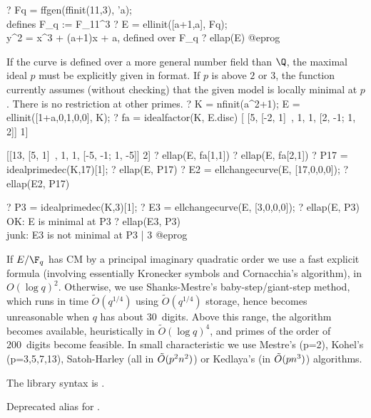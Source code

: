 ? Fq = ffgen(ffinit(11,3), 'a); \\ defines F_q := F_{11^3}
? E = ellinit([a+1,a], Fq);  \\ y^2 = x^3 + (a+1)x + a, defined over F_q
? ellap(E)
@eprog

If the curve is defined over a more general number field than $\Q$,
the maximal ideal $p$ must be explicitly given in 
format. If $p$ is above $2$ or $3$, the function currently assumes (without
checking) that the given model is locally minimal at $p$. There is no
restriction at other primes.
\bprog
? K = nfinit(a^2+1); E = ellinit([1+a,0,1,0,0], K);
? fa = idealfactor(K, E.disc)
[  [5, [-2, 1]~, 1, 1, [2, -1; 1, 2]] 1]

[[13, [5, 1]~, 1, 1, [-5, -1; 1, -5]] 2]
? ellap(E, fa[1,1])
? ellap(E, fa[2,1])
? P17 = idealprimedec(K,17)[1];
? ellap(E, P17)
? E2 = ellchangecurve(E, [17,0,0,0]);
? ellap(E2, P17)

? P3 = idealprimedec(K,3)[1];
? E3 = ellchangecurve(E, [3,0,0,0]);
? ellap(E, P3)  \\ OK: E is minimal at P3
? ellap(E3, P3) \\ junk: E3 is not minimal at P3 | 3
@eprog

 If $E/\F_q$ has CM by a principal imaginary
quadratic order we use a fast explicit formula (involving essentially
Kronecker symbols and Cornacchia's algorithm), in $O(\log q)^2$.
Otherwise, we use Shanks-Mestre's baby-step/giant-step method, which runs in
time $\tilde{O}(q^{1/4})$ using $\tilde{O}(q^{1/4})$ storage, hence becomes
unreasonable when $q$ has about 30~digits. Above this range, the 
algorithm becomes available, heuristically in $\tilde{O}(\log q)^4$, and
primes of the order of 200~digits become feasible.  In small
characteristic we use Mestre's (p=2), Kohel's (p=3,5,7,13), Satoh-Harley
(all in $\tilde{O}(p^{2}\*n^2)$) or Kedlaya's (in $\tilde{O}(p\*n^3)$)
algorithms.

The library syntax is .

\label{se:ellbil}
Deprecated alias for .

